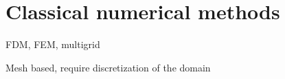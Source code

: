 \chapter{Classical numerical methods}

FDM, FEM, multigrid

Mesh based, require discretization of the domain